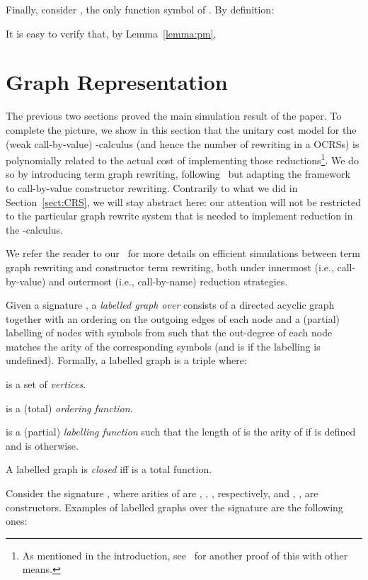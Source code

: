 \documentclass{LMCS}
\newenvironment{varitemize}
{
\begin{list}{\labelitemi}
{\setlength{\itemsep}{0.0mm}
 \setlength{\topsep}{0.0mm}
 \setlength{\parindent}{0.0mm}
 \setlength{\parskip}{0.0mm}
 \setlength{\parsep}{0.0mm}
 \setlength{\partopsep}{0.0mm}
 \setlength{\leftmargin}{15pt}
 \setlength{\labelsep}{5pt}
 \setlength{\labelwidth}{10pt}}}
{
 \end{list} 
}
\newcounter{number}
\begin{document}
Finally, consider , the only function symbol of . By definition:

It is easy to verify that, by Lemma~\ref{lemma:pm},

\section{Graph Representation}
\label{Sect:GraphRep}
The previous two sections proved the main simulation result of the paper.
To complete the picture, we show in this section that the unitary cost model
for the (weak call-by-value) -calculus (and hence the number of
rewriting in a OCRSs) is polynomially related to the actual cost of implementing those 
reductions\footnote{As mentioned in the introduction, see~\cite{Sands:Lambda02} for another 
proof of this with other means.}. We do so by introducing term graph rewriting, following~\cite{TGRbarendregt} but
adapting the framework to call-by-value constructor rewriting. Contrarily to what
we did in Section~\ref{sect:CRS}, we will stay abstract here: our attention will
not be restricted to the particular graph rewrite system that is needed to implement 
reduction in the -calculus. 

We refer the reader to our~\cite{DLM09} for more details on efficient simulations between 
term graph rewriting and constructor term rewriting, both under innermost 
(i.e., call-by-value) and outermost (i.e., call-by-name) reduction strategies.

\begin{defi}
Given a signature , a \emph{labelled graph over } consists of a directed
acyclic graph together with an ordering on the outgoing edges of each node and a (partial)
labelling of nodes with symbols from  such that the out-degree of each node
matches the arity of the corresponding symbols (and is  if the labelling is undefined).
Formally, a labelled graph is a triple 
where: 
\begin{varitemize}
\item
   is a set of \emph{vertices}.
\item
   is a (total) \emph{ordering function}.
\item
   is a (partial) \emph{labelling function} such
  that the length of  is the arity of  if
   is defined and is  otherwise.
\end{varitemize}
A labelled graph  is \emph{closed} iff  is a 
total function. 
\end{defi}
Consider the signature , where
arities of  are , , ,  respectively, and
, ,  are constructors. Examples of labelled graphs over 
the signature  are the following ones:
\end{document}
